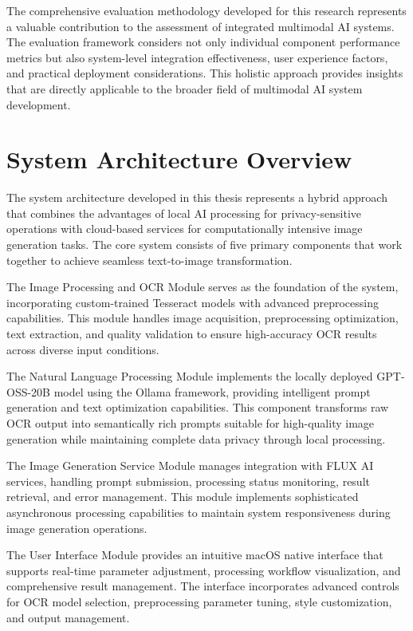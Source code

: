 The comprehensive evaluation methodology developed for this research represents a valuable contribution to the assessment of integrated multimodal AI systems. The evaluation framework considers not only individual component performance metrics but also system-level integration effectiveness, user experience factors, and practical deployment considerations. This holistic approach provides insights that are directly applicable to the broader field of multimodal AI system development.

\section{System Architecture Overview}

The system architecture developed in this thesis represents a hybrid approach that combines the advantages of local AI processing for privacy-sensitive operations with cloud-based services for computationally intensive image generation tasks. The core system consists of five primary components that work together to achieve seamless text-to-image transformation.

The Image Processing and OCR Module serves as the foundation of the system, incorporating custom-trained Tesseract models with advanced preprocessing capabilities. This module handles image acquisition, preprocessing optimization, text extraction, and quality validation to ensure high-accuracy OCR results across diverse input conditions.

The Natural Language Processing Module implements the locally deployed GPT-OSS-20B model using the Ollama framework, providing intelligent prompt generation and text optimization capabilities. This component transforms raw OCR output into semantically rich prompts suitable for high-quality image generation while maintaining complete data privacy through local processing.

The Image Generation Service Module manages integration with FLUX AI services, handling prompt submission, processing status monitoring, result retrieval, and error management. This module implements sophisticated asynchronous processing capabilities to maintain system responsiveness during image generation operations.

The User Interface Module provides an intuitive macOS native interface that supports real-time parameter adjustment, processing workflow visualization, and comprehensive result management. The interface incorporates advanced controls for OCR model selection, preprocessing parameter tuning, style customization, and output management.


